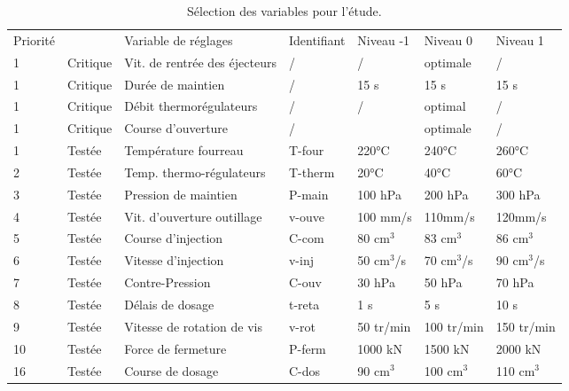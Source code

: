 \begin{table}[hbtp]
    \centering
    \begin{tabular}{|l|l|l|l|l|l|l|}
        \arrayrulecolor{black}
        \hhline{-~-----}
        Priorité &          & Variable de réglages          & Identifiant & Niveau -1 & Niveau 0   & Niveau 1   \\ \hhline{=:-:=:=:=:=:=:} %
        1        & Critique & Vit. de rentrée des éjecteurs & /           & /         & optimale   & /          \\ \hline
        1        & Critique & Durée de maintien             & /           & 15 s      & 15 s       & 15 s       \\ \hline
        1        & Critique & Débit thermorégulateurs       & /           & /         & optimal    & /          \\ \hline
        1        & Critique & Course d'ouverture            & /           &           & optimale   & /          \\ \hline
        1        & Testée   & Température fourreau          & T-four      & 220°C     & 240°C      & 260°C      \\ \hline
        2        & Testée   & Temp. thermo-régulateurs      & T-therm     & 20°C      & 40°C       & 60°C       \\ \hline
        3        & Testée   & Pression de maintien          & P-main      & 100 hPa   & 200 hPa    & 300 hPa    \\ \hline
        4        & Testée   & Vit. d'ouverture outillage    & v-ouve      & 100 mm/s  & 110mm/s    & 120mm/s    \\ \hline
        5        & Testée   & Course d'injection            & C-com       & 80 cm$^3$ & 83 cm$^3$  & 86 cm$^3$     \\ \hline
        6        & Testée   & Vitesse d'injection           & v-inj    & 50 cm$^3$/s & 70 cm$^3$/s & 90 cm$^3$/s   \\ \hline
        7        & Testée   & Contre-Pression               & C-ouv       & 30 hPa    & 50 hPa     & 70 hPa     \\ \hline
        8        & Testée   & Délais de dosage              & t-reta      & 1 s       & 5 s        & 10 s       \\ \hline
        9        & Testée   & Vitesse de rotation de vis    & v-rot       & 50 tr/min & 100 tr/min & 150 tr/min \\ \hline
        10       & Testée   & Force de fermeture            & P-ferm      & 1000 kN   & 1500 kN    & 2000 kN    \\ \hline
        16       & Testée   & Course de dosage              & C-dos       & 90 cm$^3$ & 100 cm$^3$ & 110 cm$^3$    \\ \hline
    \end{tabular}
    \caption{Sélection des variables pour l'étude.}
    \label{tab:doe_choice}
\end{table}

